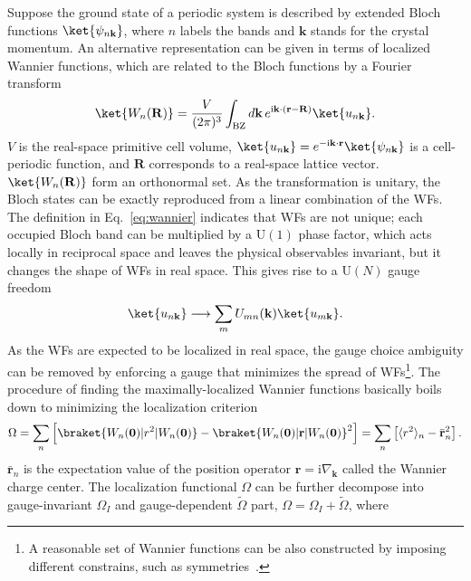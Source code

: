 Suppose the ground state of a periodic system is described by extended Bloch functions $\ket{\psi_{n \mathbf{k}}}$, where $n$ labels the bands and $\mathbf{k}$ stands for the crystal momentum. An alternative representation can be given in terms of localized Wannier functions, which are related to the Bloch functions by a Fourier transform
\begin{equation}
\ket{W_n (\mathbf{R})}= \frac{V}{(2 \pi)^3} \int_{\mathrm{BZ}} d \mathbf{k} \, e^{ \mathrm{i} \mathbf{k} \cdot ( \mathbf{r} - \mathbf{R})} \ket{u_{n \mathbf{k}}}.
\label{eq:wannier}
\end{equation}
$V$ is the real-space primitive cell volume, $\ket{u_{n \mathbf{k}}} = e^{- \mathrm{i} \mathbf{k} \cdot \mathbf{r}} \ket{\psi_{n \mathbf{k}}}$ is a cell-periodic function, and $\mathbf{R}$ corresponds to a real-space lattice vector. $\ket{W_n (\mathbf{R})}$ form an orthonormal set. As the transformation is unitary, the Bloch states can be exactly reproduced from a linear combination of the WFs. The definition in Eq.~\eqref{eq:wannier} indicates that WFs are not unique; each occupied Bloch band can be multiplied by a $\mathrm{U}(1)$ phase factor, which acts locally in reciprocal space and leaves the physical observables invariant, but it changes the shape of WFs in real space. This gives rise to a $\mathrm{U} (N)$ gauge freedom
\begin{equation}
\ket{u_{n \mathbf{k}}} \longrightarrow \sum_m U_{mn} (\mathbf{k}) \ket{u_{m \mathbf{k}}}.
\label{eq:wf_gaugefree}
\end{equation}
As the WFs are expected to be localized in real space, the gauge choice ambiguity can be removed by enforcing a gauge that minimizes the spread of WFs\footnote{A reasonable set of Wannier functions can be also constructed by imposing different constrains, such as symmetries~\cite{PhysRevB.49.10869, Sporkmann_1997}.}. The procedure of finding the maximally-localized Wannier functions basically boils down to minimizing the localization criterion 
\begin{equation}
\Omega = \sum_n \left[ \braket{ W_n (\mathbf{0}) | r^2 | W_n (\mathbf{0})} - \braket{ W_n (\mathbf{0}) | \mathbf{r} | W_n (\mathbf{0})}^2 \right] = \sum_n \left[ \langle r^2 \rangle_n -\bar{\mathbf{r}}_n^2 \right].
\label{eq:loc_crit}
\end{equation}
$\bar{\mathbf{r}}_n$ is the expectation value of the position operator $\mathbf{r} = \mathrm{i} \nabla_{\mathbf{k}}$ called the Wannier charge center. The localization functional $\Omega$ can be further decompose into gauge-invariant $\Omega_I$ and gauge-dependent $\tilde{\Omega}$ part, $\Omega = \Omega_I + \tilde{\Omega}$, where
